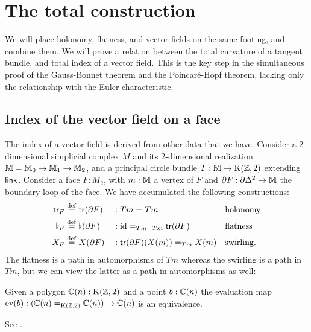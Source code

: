 \section{The total construction}
\label{sec:totals}
We will place holonomy, flatness, and vector fields on the same footing, and combine them. We will prove a relation between the total curvature of a tangent bundle, and total index of a vector field. This is the key step in the simultaneous proof of the Gauss-Bonnet theorem and the Poincaré-Hopf theorem, lacking only the relationship with the Euler characteristic.

\subsection{Index of the vector field on a face}
The index of a vector field is derived from other data that we have. Consider a 2-dimensional simplicial complex \( M \) and its 2-dimensional realization \( \mathbb{M}=\mathbb{M}_0\to\mathbb{M}_1\to\mathbb{M}_2 \), and a principal circle bundle \( T:\mathbb{M}\to\mathrm{K}(\mathbb{Z},2) \) extending \( \operatorname{\mathsf{link}} \). Consider a face \( F:M_2 \), with \( m:\mathbb{M} \) a vertex of \( F \) and \( \partial F:\partial\Delta^2\to\mathbb{M} \) the boundary loop of the face. We have accumulated the following constructions:
\[\begin{aligned}
\mathsf{tr}_F&\stackrel{\mathrm{def}}{=} \mathsf{tr}(\partial F)&&:Tm=Tm&&\text{holonomy}\\
\flat_F&\stackrel{\mathrm{def}}{=} \flat(\partial F)&&:\text{id}=_{Tm=Tm}\mathsf{tr}(\partial F)&&\text{flatness}\\
X_F&\stackrel{\mathrm{def}}{=} X(\partial F)&&:\mathsf{tr}(\partial F)(X(m))=_{Tm}X(m)&&\text{swirling.}\\
\end{aligned}\]
The flatness is a path in automorphisms of \( Tm \) whereas the swirling is a path in \( Tm \), but we can view the latter as a path in automorphisms as well:
\begin{myprop}
\label{prop:eveq}
Given a polygon \( \mathbb{C}(n):\mathrm{K}(\mathbb{Z},2) \) and a point \( b:\mathbb{C}(n) \) the evaluation map \( \mathrm{ev}(b):(\mathbb{C}(n)=_{\mathrm{K}(\mathbb{Z},2)}\mathbb{C}(n))\to \mathbb{C}(n) \) is an equivalence.
\end{myprop}
\begin{myproof}
See \cite{buchholtz2023central}.
\end{myproof}

